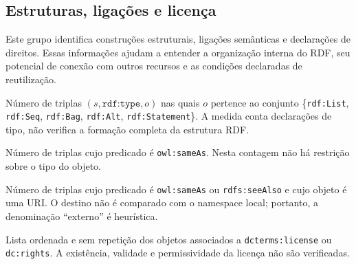 \documentclass[12pt,a4paper]{article}
\newcommand{\metrica}[1]{\texttt{#1}}
\begin{document}
\subsection{Estruturas, ligações e licença}
Este grupo identifica construções estruturais, ligações semânticas e declarações de direitos. Essas informações ajudam a entender a organização interna do RDF, seu potencial de conexão com outros recursos e as condições declaradas de reutilização.
\begin{description}[style=nextline]
  \item[\metrica{rdf\_structures}]
Número de triplas \((s,\texttt{rdf:type},o)\) nas quais \(o\) pertence ao conjunto \{\texttt{rdf:List}, \texttt{rdf:Seq}, \texttt{rdf:Bag}, \texttt{rdf:Alt}, \texttt{rdf:Statement}\}. A medida conta declarações de tipo, não verifica a formação completa da estrutura RDF.
  \item[\metrica{same\_as\_links}]
Número de triplas cujo predicado é \texttt{owl:sameAs}. Nesta contagem não há restrição sobre o tipo do objeto.
  \item[\metrica{external\_links}]
Número de triplas cujo predicado é \texttt{owl:sameAs} ou \texttt{rdfs:seeAlso} e cujo objeto é uma URI. O destino não é comparado com o namespace local; portanto, a denominação ``externo'' é heurística.
  \item[\metrica{licenses}]
Lista ordenada e sem repetição dos objetos associados a \texttt{dcterms:license} ou \texttt{dc:rights}. A existência, validade e permissividade da licença não são verificadas.
\end{description}
\end{document}
